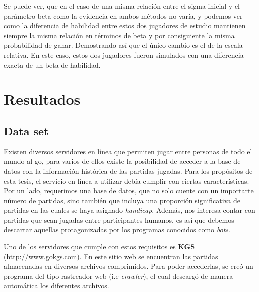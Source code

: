 \documentclass[11pt,twoside, spanish]{report} %
\begin{document}
Se puede ver, que en el caso de una misma relaci\'on entre el sigma inicial y el par\'ametro beta como la evidencia en ambos m\'etodos  no var\'ia, y podemos ver como la diferencia de habilidad entre estos dos jugadores de estudio mantienen siempre la misma relaci\'on en t\'erminos de beta y por consiguiente la misma probabilidad de ganar.
Demostrando as\'i que el \'unico cambio es el de la escala relativa.
En este caso, estos dos jugadores fueron simulados con una diferencia exacta de un beta de habilidad.











\chapter{Resultados}

\section{Data set}


Existen diversos servidores en l\'inea que permiten jugar entre personas de todo el mundo al go, para varios de ellos existe la posibilidad de acceder a la base de datos con la informaci\'on hist\'orica de las partidas jugadas.
Para los prop\'ositos de esta tesis, el servicio en l\'inea a utilizar deb\'ia cumplir con ciertas caracter\'isticas.
Por un lado, requerimos una base de datos, que no solo cuente con un importarte n\'umero de partidas, sino tambi\'en que incluya una proporci\'on significativa de partidas en las cuales se haya asignado \textit{handicap}.
Adem\'as, nos interesa contar con partidas que sean jugadas entre participantes humanos, es as\'i que debemos descartar aquellas protagonizadas por los programas conocidos como \textit{bots}.

Uno de los servidores que cumple con estos requisitos es \textbf{KGS} (\url{http://www.gokgs.com}).
En este sitio web se encuentran las partidas almacenadas en diversos archivos comprimidos.
Para poder accederlas, se cre\'o un programa del tipo rastreador web (i.e \textit{crawler}), el cual descarg\'o de manera autom\'atica los diferentes archivos.
\end{document}
